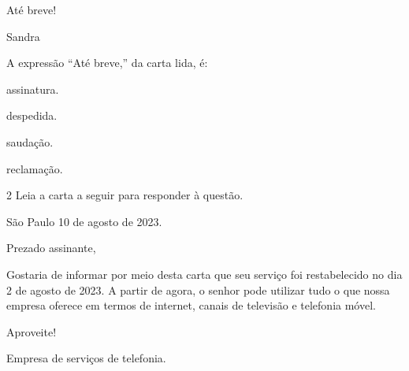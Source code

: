 \begin{conteudo}
\begin{conteudo}
\begin{mdframed}[linewidth=10pt,linecolor=salmao!20,backgroundcolor=salmao!20,roundcorner=20pt]
\begin{flushright}
Até breve!

Sandra
\end{flushright}

\end{mdframed}

A expressão ``Até breve,'' da carta lida, é:

\begin{escolha}
\item assinatura.

\item despedida.

\item saudação.

\item reclamação.
\end{escolha}

\num{2} Leia a carta a seguir para responder à questão.


\begin{mdframed}[linewidth=10pt,linecolor=salmao!20,backgroundcolor=salmao!20,roundcorner=20pt]
\begin{flushright}
São Paulo 10 de agosto de 2023.
\end{flushright}

Prezado assinante,

Gostaria de informar por meio desta carta que seu serviço foi restabelecido no dia 2 de agosto de 2023. A partir de agora, o senhor pode utilizar tudo o que nossa empresa oferece em termos de internet, canais de televisão e telefonia móvel.

Aproveite!

Empresa de serviços de telefonia.

\end{mdframed}


\end{conteudo}
\end{conteudo}
